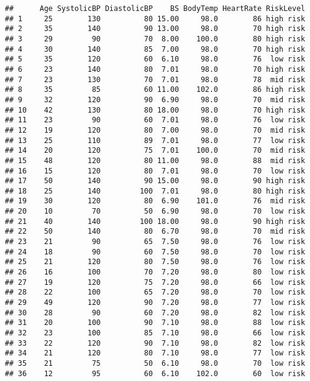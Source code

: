 \documentclass[
  ignorenonframetext,
]{beamer}
\begin{document}
\begin{frame}[fragile]
\begin{verbatim}
##      Age SystolicBP DiastolicBP    BS BodyTemp HeartRate RiskLevel
## 1     25        130          80 15.00     98.0        86 high risk
## 2     35        140          90 13.00     98.0        70 high risk
## 3     29         90          70  8.00    100.0        80 high risk
## 4     30        140          85  7.00     98.0        70 high risk
## 5     35        120          60  6.10     98.0        76  low risk
## 6     23        140          80  7.01     98.0        70 high risk
## 7     23        130          70  7.01     98.0        78  mid risk
## 8     35         85          60 11.00    102.0        86 high risk
## 9     32        120          90  6.90     98.0        70  mid risk
## 10    42        130          80 18.00     98.0        70 high risk
## 11    23         90          60  7.01     98.0        76  low risk
## 12    19        120          80  7.00     98.0        70  mid risk
## 13    25        110          89  7.01     98.0        77  low risk
## 14    20        120          75  7.01    100.0        70  mid risk
## 15    48        120          80 11.00     98.0        88  mid risk
## 16    15        120          80  7.01     98.0        70  low risk
## 17    50        140          90 15.00     98.0        90 high risk
## 18    25        140         100  7.01     98.0        80 high risk
## 19    30        120          80  6.90    101.0        76  mid risk
## 20    10         70          50  6.90     98.0        70  low risk
## 21    40        140         100 18.00     98.0        90 high risk
## 22    50        140          80  6.70     98.0        70  mid risk
## 23    21         90          65  7.50     98.0        76  low risk
## 24    18         90          60  7.50     98.0        70  low risk
## 25    21        120          80  7.50     98.0        76  low risk
## 26    16        100          70  7.20     98.0        80  low risk
## 27    19        120          75  7.20     98.0        66  low risk
## 28    22        100          65  7.20     98.0        70  low risk
## 29    49        120          90  7.20     98.0        77  low risk
## 30    28         90          60  7.20     98.0        82  low risk
## 31    20        100          90  7.10     98.0        88  low risk
## 32    23        100          85  7.10     98.0        66  low risk
## 33    22        120          90  7.10     98.0        82  low risk
## 34    21        120          80  7.10     98.0        77  low risk
## 35    21         75          50  6.10     98.0        70  low risk
## 36    12         95          60  6.10    102.0        60  low risk

\end{verbatim}
\end{frame}
\end{document}
